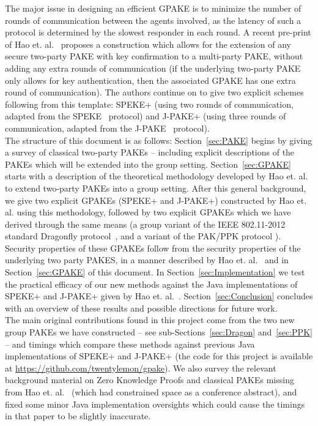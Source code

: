\documentclass{amsart}
\theoremstyle{remark}
\begin{document}
The major issue in designing an efficient GPAKE is to minimize the number of rounds of communication 
between the agents involved, as the latency of such a protocol is determined by the slowest responder 
in each round.  A recent pre-print of Hao et. al.~\cite{HaYiChSh15} proposes a construction which 
allows for the extension of any secure two-party PAKE  with key confirmation to a multi-party PAKE,
without adding any extra rounds of communication (if the underlying two-party PAKE only allows for
key authentication, then the associated GPAKE has one extra round of communication).  The authors continue 
on to give two explicit schemes following from this template: SPEKE+ (using two rounds of communication, 
adapted from the SPEKE~\cite{Ja96} protocol) and J-PAKE+ (using three rounds of communication, adapted from 
the J-PAKE~\cite{HaRy2010} protocol).
\\ 

The structure of this document is as follows: Section~\ref{sec:PAKE} begins by giving a survey of classical 
two-party PAKEs -- including explicit descriptions of the PAKEs which will be extended into the group 
setting.  Section~\ref{sec:GPAKE} 
starts with a description of the theoretical methodology developed by Hao et. al.~\cite{HaYiChSh15} to extend 
two-party PAKEs into a group setting.  After this general background, we give two explicit GPAKEs 
(SPEKE+ and J-PAKE+) constructed by Hao et. al. using this methodology, followed by two explicit GPAKEs 
which we have derived through the same means (a group variant of the IEEE 802.11-2012 standard Dragonfly 
protocol~\cite{Ha15}, and a variant of the PAK/PPK protocol \cite{BoMaPa00}).  Security properties of these
GPAKEs follow from the security properties of the underlying two party PAKES, in a manner described by Hao et. al.~\cite{HaYiChSh15} 
and in Section~\ref{sec:GPAKE} of this document.  In Section~\ref{sec:Implementation} we test the practical efficacy of our new methods 
against the Java implementations of SPEKE+ and J-PAKE+ given by Hao et. al.~\cite{HaYiChSh15}.  Section~\ref{sec:Conclusion} 
concludes with an overview of these results and possible directions for future work.
\\ 

The main original contributions found in this project come from the two new group PAKEs we have constructed 
-- see sub-Sections~\ref{sec:Dragon} and~\ref{sec:PPK} -- and timings 
which compare these methods against previous Java implementations of SPEKE+ and J-PAKE+ (the code for this project is 
available at \url{https://github.com/twentylemon/gpake}).  
We also survey the relevant background material on Zero Knowledge Proofs and classical PAKEs missing from
Hao et. al.~\cite{HaYiChSh15} (which had constrained space as a conference abstract), and fixed some minor 
Java implementation oversights which could cause the timings in that paper to be slightly inaccurate.
\end{document}
